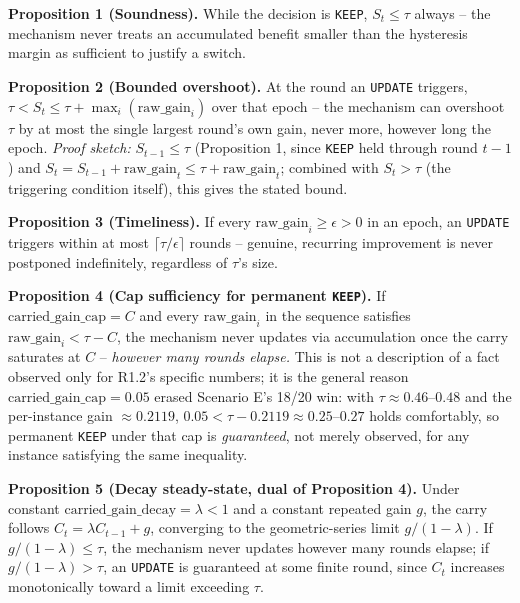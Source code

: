 \documentclass[11pt]{article}
\begin{document}
\textbf{Proposition 1 (Soundness).} While the decision is \texttt{KEEP},
$S_t \leq \tau$ always -- the mechanism never treats an accumulated
benefit smaller than the hysteresis margin as sufficient to justify a
switch.

\textbf{Proposition 2 (Bounded overshoot).} At the round an
\texttt{UPDATE} triggers, $\tau < S_t \leq \tau + \max_i(\text{raw\_gain}_i)$
over that epoch -- the mechanism can overshoot $\tau$ by at most the
single largest round's own gain, never more, however long the epoch.
\emph{Proof sketch:} $S_{t-1} \leq \tau$ (Proposition 1, since \texttt{KEEP}
held through round $t-1$) and $S_t = S_{t-1} + \text{raw\_gain}_t \leq \tau
+ \text{raw\_gain}_t$; combined with $S_t > \tau$ (the triggering
condition itself), this gives the stated bound.

\textbf{Proposition 3 (Timeliness).} If every $\text{raw\_gain}_i \geq
\epsilon > 0$ in an epoch, an \texttt{UPDATE} triggers within at most
$\lceil \tau/\epsilon \rceil$ rounds -- genuine, recurring improvement is
never postponed indefinitely, regardless of $\tau$'s size.

\textbf{Proposition 4 (Cap sufficiency for permanent \texttt{KEEP}).} If
$\text{carried\_gain\_cap}=C$ and every $\text{raw\_gain}_i$ in the
sequence satisfies $\text{raw\_gain}_i < \tau - C$, the mechanism never
updates via accumulation once the carry saturates at $C$ -- \emph{however
many rounds elapse.} This is not a description of a fact observed only
for R1.2's specific numbers; it is the general reason $\text{carried\_
gain\_cap}=0.05$ erased Scenario E's 18/20 win: with $\tau\approx
0.46$--$0.48$ and the per-instance gain $\approx 0.2119$, $0.05 < \tau -
0.2119 \approx 0.25$--$0.27$ holds comfortably, so permanent \texttt{KEEP}
under that cap is \emph{guaranteed}, not merely observed, for any instance
satisfying the same inequality.

\textbf{Proposition 5 (Decay steady-state, dual of Proposition 4).} Under
constant $\text{carried\_gain\_decay}=\lambda<1$ and a constant repeated
gain $g$, the carry follows $C_t = \lambda C_{t-1} + g$, converging to the
geometric-series limit $g/(1-\lambda)$. If $g/(1-\lambda) \leq \tau$, the
mechanism never updates however many rounds elapse; if $g/(1-\lambda) >
\tau$, an \texttt{UPDATE} is guaranteed at some finite round, since $C_t$
increases monotonically toward a limit exceeding $\tau$.
\end{document}

